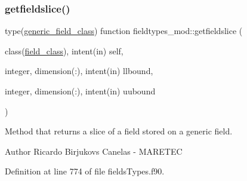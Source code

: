 \subsubsection{\texorpdfstring{getfieldslice()}{getfieldslice()}}
{\footnotesize\ttfamily type(\mbox{\hyperlink{structfieldtypes__mod_1_1generic__field__class}{generic\+\_\+field\+\_\+class}}) function fieldtypes\+\_\+mod\+::getfieldslice (\begin{DoxyParamCaption}\item[{class(\mbox{\hyperlink{structfieldtypes__mod_1_1field__class}{field\+\_\+class}}), intent(in)}]{self,  }\item[{integer, dimension(\+:), intent(in)}]{llbound,  }\item[{integer, dimension(\+:), intent(in)}]{uubound }\end{DoxyParamCaption})\hspace{0.3cm}{\ttfamily [private]}}



Method that returns a slice of a field stored on a generic field. 

\begin{DoxyAuthor}{Author}
Ricardo Birjukovs Canelas -\/ M\+A\+R\+E\+T\+EC 
\end{DoxyAuthor}


Definition at line 774 of file fields\+Types.\+f90.


